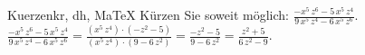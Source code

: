 \begin{MAufgabe}{Kuerzen}{kr, dh, MaTeX}
K\"urzen Sie soweit m\"oglich: $\frac{ - x^5\, z^6 - 5\, x^5\, z^4}{9\, x^5\, z^4 - 6\, x^5\, z^6}$.\\ 
\ifLsg\MLoesung
\quad $\frac{ - x^5\, z^6 - 5\, x^5\, z^4}{9\, x^5\, z^4 - 6\, x^5\, z^6}=\frac{(x^5\, z^4)\cdot( - z^2 - 5)}{(x^5\, z^4)\cdot(9 - 6\, z^2)}=\frac{ - z^2 - 5}{9 - 6\, z^2}=\frac{z^2 + 5}{6\, z^2 - 9}$.\else\relax\fi
 \end{MAufgabe}
